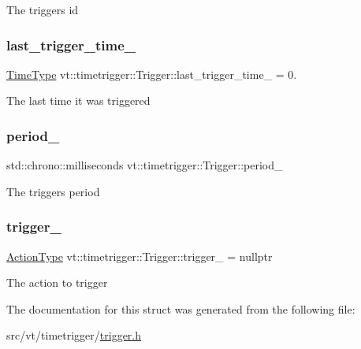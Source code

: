 The trigger\textquotesingle{}s id \mbox{\label{structvt_1_1timetrigger_1_1_trigger_ac844f5940943ca203c90dd485d47a0c6}} 
\subsubsection{\texorpdfstring{last\+\_\+trigger\+\_\+time\+\_\+}{last\_trigger\_time\_}}
{\footnotesize\ttfamily \hyperlink{namespacevt_a876a9d0cd5a952859c72de8a46881442}{Time\+Type} vt\+::timetrigger\+::\+Trigger\+::last\+\_\+trigger\+\_\+time\+\_\+ = 0.\hspace{0.3cm}{\ttfamily [private]}}

The last time it was triggered \mbox{\label{structvt_1_1timetrigger_1_1_trigger_aa95009a5d9a17ffdb84b5317a7a5dfc2}} 
\subsubsection{\texorpdfstring{period\+\_\+}{period\_}}
{\footnotesize\ttfamily std\+::chrono\+::milliseconds vt\+::timetrigger\+::\+Trigger\+::period\+\_\+\hspace{0.3cm}{\ttfamily [private]}}

The trigger\textquotesingle{}s period \mbox{\label{structvt_1_1timetrigger_1_1_trigger_ac1d93e6fff9b0faa8889198e481d50d4}} 
\subsubsection{\texorpdfstring{trigger\+\_\+}{trigger\_}}
{\footnotesize\ttfamily \hyperlink{namespacevt_ae0a5a7b18cc99d7b732cb4d44f46b0f3}{Action\+Type} vt\+::timetrigger\+::\+Trigger\+::trigger\+\_\+ = nullptr\hspace{0.3cm}{\ttfamily [private]}}

The action to trigger 

The documentation for this struct was generated from the following file\+:\begin{DoxyCompactItemize}
\item 
src/vt/timetrigger/\hyperlink{trigger_8h}{trigger.\+h}\end{DoxyCompactItemize}
